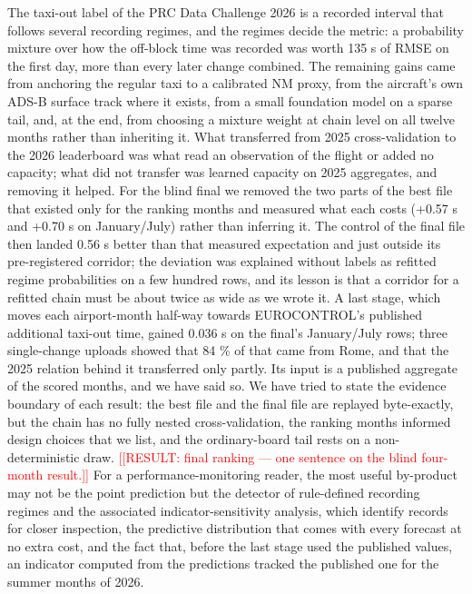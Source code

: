 \documentclass[11pt,a4paper]{article}
\newcommand{\placeholder}[1]{\textcolor{red}{[[RESULT:#1]]}}
\begin{document}
The taxi-out label of the PRC Data Challenge 2026 is a recorded interval that follows several recording regimes, and the regimes decide the metric: a probability mixture over how the off-block time was recorded was worth 135 s of RMSE on the first day, more than every later change combined. The remaining gains came from anchoring the regular taxi to a calibrated NM proxy, from the aircraft's own ADS-B surface track where it exists, from a small foundation model on a sparse tail, and, at the end, from choosing a mixture weight at chain level on all twelve months rather than inheriting it. What transferred from 2025 cross-validation to the 2026 leaderboard was what read an observation of the flight or added no capacity; what did not transfer was learned capacity on 2025 aggregates, and removing it helped. For the blind final we removed the two parts of the best file that existed only for the ranking months and measured what each costs (+0.57 s and +0.70 s on January/July) rather than inferring it. The control of the final file then landed 0.56 s better than that measured expectation and just outside its pre-registered corridor; the deviation was explained without labels as refitted regime probabilities on a few hundred rows, and its lesson is that a corridor for a refitted chain must be about twice as wide as we wrote it. A last stage, which moves each airport-month half-way towards EUROCONTROL's published additional taxi-out time, gained 0.036 s on the final's January/July rows; three single-change uploads showed that 84 \% of that came from Rome, and that the 2025 relation behind it transferred only partly. Its input is a published aggregate of the scored months, and we have said so. We have tried to state the evidence boundary of each result: the best file and the final file are replayed byte-exactly, but the chain has no fully nested cross-validation, the ranking months informed design choices that we list, and the ordinary-board tail rests on a non-deterministic draw. \placeholder{ final ranking --- one sentence on the blind four-month result.} For a performance-monitoring reader, the most useful by-product may not be the point prediction but the detector of rule-defined recording regimes and the associated indicator-sensitivity analysis, which identify records for closer inspection, the predictive distribution that comes with every forecast at no extra cost, and the fact that, before the last stage used the published values, an indicator computed from the predictions tracked the published one for the summer months of 2026.
\end{document}
